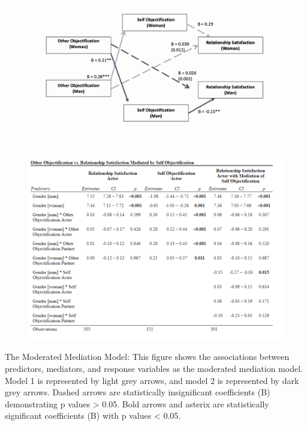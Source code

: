 \documentclass[
  english,
  man,floatsintext]{apa6}
\begin{document}
\begin{figure}
\includegraphics[width=1\linewidth]{Images/hypothesis_model_results} \caption{ }\label{fig:unnamed-chunk-3}
\end{figure}

\begin{figure}
\includegraphics[width=1\linewidth]{Images/ResultsTable} \caption{ }\label{fig:unnamed-chunk-4}
\end{figure}

The Moderated Mediation Model: This figure shows the associations between predictors, mediators, and response variables as the moderated mediation model. Model 1 is represented by light grey arrows, and model 2 is represented by dark grey arrows. Dashed arrows are statistically insignificant coefficients (B) demonstrating p values \textgreater{} 0.05. Bold arrows and asterix are statistically significant coefficients (B) with p values \textless{} 0.05.
\end{document}
